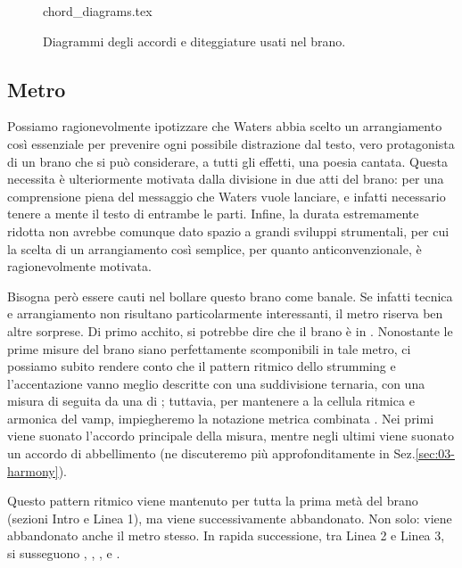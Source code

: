 \documentclass[class=book, crop=false, oneside, 12pt]{standalone}
\begin{document}
    \begin{figure}
        {chord_diagrams.tex}
        \caption{Diagrammi degli accordi e diteggiature usati nel brano.}
        \label{fig:03-chords}
    \end{figure}

    \subsection{Metro}
    Possiamo ragionevolmente ipotizzare che Waters abbia scelto un arrangiamento così essenziale per prevenire ogni possibile distrazione dal testo, vero protagonista di un brano che si può considerare, a tutti gli effetti, una poesia cantata. Questa necessita è ulteriormente motivata dalla divisione in due atti del brano: per una comprensione piena del messaggio che Waters vuole lanciare, e infatti necessario tenere a mente il testo di entrambe le parti. Infine, la durata estremamente ridotta non avrebbe comunque dato spazio a grandi sviluppi strumentali, per cui la scelta di un arrangiamento così semplice, per quanto anticonvenzionale, è ragionevolmente motivata. 

    Bisogna però essere cauti nel bollare questo brano come banale. Se infatti  tecnica e arrangiamento  non risultano particolarmente interessanti, il metro riserva ben altre sorprese. Di primo acchito, si potrebbe dire che il brano è in . Nonostante le prime misure del brano siano perfettamente scomponibili in tale metro, ci possiamo subito rendere conto che il pattern ritmico dello strumming e l'accentazione vanno meglio descritte con una suddivisione ternaria, con una misura di  seguita da una di ; tuttavia, per mantenere a la cellula ritmica e armonica del vamp, impiegheremo la notazione metrica combinata   . Nei primi  viene suonato l'accordo principale della misura, mentre negli ultimi  viene suonato un accordo di abbellimento (ne discuteremo più approfonditamente in Sez.\ref{sec:03-harmony}). 
    
    \begin{sheet}[htbp]
        \centering
        \caption{Pattern ritmico dell'introduzione.}
        \label{sheet:potw-rhythm_intro}
    \end{sheet}

    Questo pattern ritmico viene mantenuto per tutta la prima metà del brano (sezioni Intro e Linea 1), ma viene successivamente abbandonato. Non solo: viene abbandonato anche il metro stesso. In rapida successione, tra Linea 2 e Linea 3, si susseguono , , ,  e .
\end{document}

